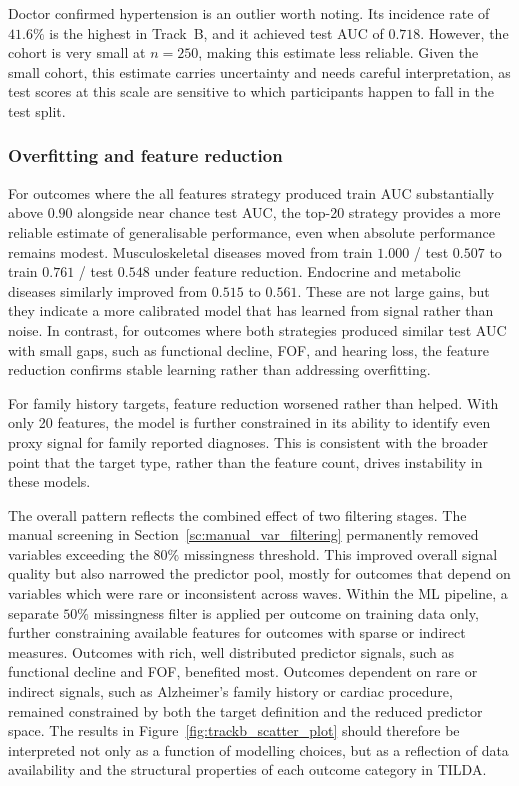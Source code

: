 Doctor confirmed hypertension is an outlier worth noting. Its incidence rate of $41.6\%$ is the highest in Track~B, and it achieved test \gls{AUC} of $0.718$. However, the cohort is very small at $n = 250$, making this estimate less reliable. Given the small cohort, this estimate carries uncertainty and needs careful interpretation, as test scores at this scale are sensitive to which participants happen to fall in the test split.

\subsubsection{Overfitting and feature reduction}\label{ssc:trackb_overfitting}
For outcomes where the all features strategy produced train \gls{AUC} substantially above $0.90$ alongside near chance test \gls{AUC}, the top-20 strategy provides a more reliable estimate of generalisable performance, even when absolute performance remains modest. Musculoskeletal diseases moved from train $1.000$ / test $0.507$ to train $0.761$ / test $0.548$ under feature reduction. Endocrine and metabolic diseases similarly improved from $0.515$ to $0.561$. These are not large gains, but they indicate a more calibrated model that has learned from signal rather than noise. In contrast, for outcomes where both strategies produced similar test \gls{AUC} with small gaps, such as functional decline, \gls{FOF}, and hearing loss, the feature reduction confirms stable learning rather than addressing overfitting.

For family history targets, feature reduction worsened rather than helped. With only 20 features, the model is further constrained in its ability to identify even proxy signal for family reported diagnoses. This is consistent with the broader point that the target type, rather than the feature count, drives instability in these models.

The overall pattern reflects the combined effect of two filtering stages. The manual screening in Section~\ref{sc:manual_var_filtering} permanently removed variables exceeding the $80\%$ missingness threshold. This improved overall signal quality but also narrowed the predictor pool, mostly for outcomes that depend on variables which were rare or inconsistent across waves. Within the ML pipeline, a separate $50\%$ missingness filter is applied per outcome on training data only, further constraining available features for outcomes with sparse or indirect measures. Outcomes with rich, well distributed predictor signals, such as functional decline and \gls{FOF}, benefited most. Outcomes dependent on rare or indirect signals, such as Alzheimer's family history or cardiac procedure, remained constrained by both the target definition and the reduced predictor space. The results in Figure~\ref{fig:trackb_scatter_plot} should therefore be interpreted not only as a function of modelling choices, but as a reflection of data availability and the structural properties of each outcome category in \gls{TILDA}.

